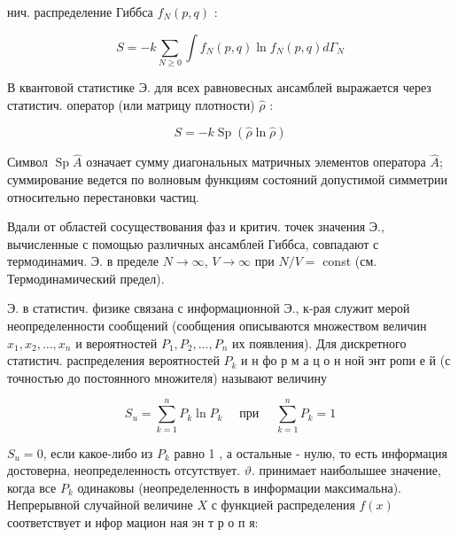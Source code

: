 \documentclass[10pt]{article}
\begin{document}
нич. распределение Гиббса $f_{N}(p, q)$ :



\[

S=-k \sum_{N \geqslant 0} \int f_{N}(p, q) \ln f_{N}(p, q) d \Gamma_{N}

\]



В квантовой статистике Э. для всех равновесных ансамблей выражается через статистич. оператор (или матрицу плотности) $\hat{\rho}$ :



\[

S=-k \operatorname{Sp}(\hat{\rho} \ln \hat{\rho})

\]



Символ $\operatorname{Sp} \hat{A}$ означает сумму диагональных матричных элементов оператора $\hat{A}$; суммирование ведется по волновым функциям состояний допустимой симметрии относительно перестановки частиц.



Вдали от областей сосуществования фаз и критич. точек значения Э., вычисленные с помощью различных ансамблей Гиббса, совпадают с термодинамич. Э. в пределе $N \rightarrow \infty$, $V \rightarrow \infty$ при $N / V=$ const (см. Термодинамический предел).



Э. в статистич. физике связана с информационной $Э$., к-рая служит мерой неопределенности сообщений (сообщения описываются множеством величин $x_{1}, x_{2}, \ldots, x_{n}$ и вероятностей $P_{1}, P_{2}, \ldots, P_{n}$ их появления). Для дискретного статистич. распределения вероятностей $P_{k}$ и н фо р м а ц о н ной энт ропи е й (с точностью до постоянного множителя) называют величину



\[

S_{u}=\sum_{k=1}^{n} P_{k} \ln P_{k} \quad \text { при } \quad \sum_{k=1}^{n} P_{k}=1

\]



$S_{u}=0$, если какое-либо из $P_{k}$ равно 1 , а остальные - нулю, то есть информация достоверна, неопределенность отсутствует. $\vartheta$. принимает наиболышее значение, когда все $P_{k}$ одинаковы (неопределенность в информации максимальна). Непрерывной случайной величине $X$ с функцией распределения $f(x)$ соответствует и нфор мацион ная эн т р о п я:
\end{document}
